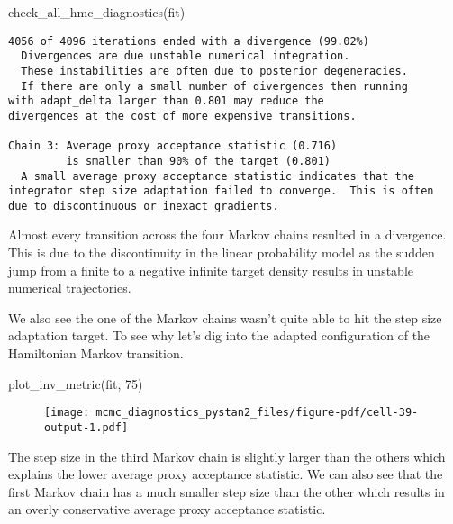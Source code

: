 \documentclass[
  letterpaper,
  DIV=11,
  numbers=noendperiod]{scrartcl}
\newenvironment{Shaded}{\begin{snugshade}}{\end{snugshade}}
\newcommand{\DecValTok}[1]{\textcolor[rgb]{0.68,0.00,0.00}{#1}}
\newcommand{\NormalTok}[1]{\textcolor[rgb]{0.00,0.23,0.31}{#1}}
\begin{document}
\begin{Shaded}
\begin{Highlighting}[]
\NormalTok{check\_all\_hmc\_diagnostics(fit)}
\end{Highlighting}
\end{Shaded}

\begin{verbatim}
4056 of 4096 iterations ended with a divergence (99.02%)
  Divergences are due unstable numerical integration.
  These instabilities are often due to posterior degeneracies.
  If there are only a small number of divergences then running
with adapt_delta larger than 0.801 may reduce the
divergences at the cost of more expensive transitions.

Chain 3: Average proxy acceptance statistic (0.716)
         is smaller than 90% of the target (0.801)
  A small average proxy acceptance statistic indicates that the
integrator step size adaptation failed to converge.  This is often
due to discontinuous or inexact gradients.

\end{verbatim}

Almost every transition across the four Markov chains resulted in a
divergence. This is due to the discontinuity in the linear probability
model as the sudden jump from a finite to a negative infinite target
density results in unstable numerical trajectories.

We also see the one of the Markov chains wasn't quite able to hit the
step size adaptation target. To see why let's dig into the adapted
configuration of the Hamiltonian Markov transition.

\begin{Shaded}
\begin{Highlighting}[]
\NormalTok{plot\_inv\_metric(fit, }\DecValTok{75}\NormalTok{)}
\end{Highlighting}
\end{Shaded}

\begin{figure}[H]

{\centering \texttt{[image: mcmc\_diagnostics\_pystan2\_files/figure-pdf/cell-39-output-1.pdf]}

}

\end{figure}

The step size in the third Markov chain is slightly larger than the
others which explains the lower average proxy acceptance statistic. We
can also see that the first Markov chain has a much smaller step size
than the other which results in an overly conservative average proxy
acceptance statistic.
\end{document}
